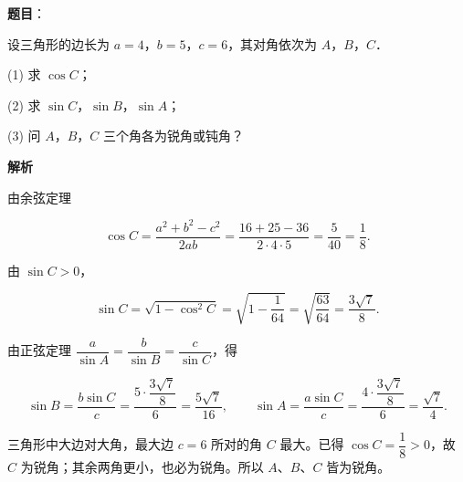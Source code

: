 \begin{answer}

\textbf{题目}：

设三角形的边长为 $a=4$，$b=5$，$c=6$，其对角依次为 $A$，$B$，$C$．

  (1) 求 $\cos C$；

  (2) 求 $\sin C$，$\sin B$，$\sin A$；

  (3) 问 $A$，$B$，$C$ 三个角各为锐角或钝角？

\textbf{解析}


由余弦定理

\nopagebreak[4]
\[
\cos C=\dfrac{a^2+b^2-c^2}{2ab}=\dfrac{16+25-36}{2\cdot4\cdot5}=\dfrac5{40}=\dfrac18.
\]


由 $\sin C>0$，

\nopagebreak[4]
\[
\sin C=\sqrt{1-\cos^2C}=\sqrt{1-\dfrac1{64}}=\sqrt{\dfrac{63}{64}}=\dfrac{3\sqrt7}{8}.
\]

由正弦定理 $\dfrac{a}{\sin A}=\dfrac{b}{\sin B}=\dfrac{c}{\sin C}$，得

\nopagebreak[4]
\[
\sin B=\dfrac{b\sin C}{c}=\dfrac{5\cdot\dfrac{3\sqrt7}{8}}{6}=\dfrac{5\sqrt7}{16},
\qquad
\sin A=\dfrac{a\sin C}{c}=\dfrac{4\cdot\dfrac{3\sqrt7}{8}}{6}=\dfrac{\sqrt7}{4}.
\]


三角形中大边对大角，最大边 $c=6$ 所对的角 $C$ 最大。已得 $\cos C=\dfrac18>0$，故 $C$ 为锐角；其余两角更小，也必为锐角。所以 $A$、$B$、$C$ 皆为锐角。




\end{answer}
